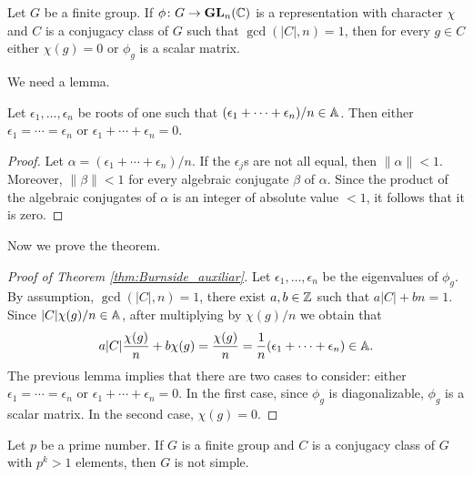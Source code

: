 \begin{theorem}[Burnside]
	\label{thm:Burnside_auxiliar}
	Let $G$ be a finite group. If $\phi\colon G\to\mathbf{GL}_n(\mathbb{C})$ is a representation
	with character $\chi$ and $C$ is a conjugacy class of $G$ such that 
	$\gcd(|C|,n)=1$, then for every $g\in C$ either 
	$\chi(g)=0$ or $\phi_g$ is a scalar matrix. 
\end{theorem}

We need a lemma.

\begin{lemma}
	\label{lem:4Burnside}
	Let $\epsilon_1,\dots,\epsilon_n$ be roots of one such that 
	$(\epsilon_1+\cdots+\epsilon_n)/n\in\mathbb{A}$. Then either 
	$\epsilon_1=\cdots=\epsilon_n$ or 
	$\epsilon_1+\cdots+\epsilon_n=0$.
\end{lemma}

\begin{proof}
	Let $\alpha=(\epsilon_1+\cdots+\epsilon_n)/n$.
	If the $\epsilon_j$s are not all equal, then $\|\alpha\|<1$. Moreover, 
	$\|\beta\|<1$ for every algebraic conjugate $\beta$ of $\alpha$. Since the product 
	of the algebraic conjugates of $\alpha$ is an integer of absolute value 
	$<1$, it follows that it is zero. 
\end{proof}

Now we prove the theorem.

\begin{proof}[Proof of Theorem \ref{thm:Burnside_auxiliar}]
	Let $\epsilon_1,\dots,\epsilon_n$ be the eigenvalues of $\phi_g$. By assumption, 
	$\gcd(|C|,n)=1$, there exist $a,b\in\mathbb{Z}$ such that $a|C|+bn=1$. Since 
	$|C|\chi(g)/n\in\mathbb{A}$, after multiplying by $\chi(g)/n$ we obtain that  
	\[
		a|C|\frac{\chi(g)}{n}+b\chi(g)=\frac{\chi(g)}{n}=\frac{1}{n}(\epsilon_1+\cdots+\epsilon_n)\in\mathbb{A}.
	\]
	The previous lemma implies that there are two cases to consider: 
	either $\epsilon_1=\cdots=\epsilon_n$ or $\epsilon_1+\cdots+\epsilon_n=0$. In the first
	case, since $\phi_g$ is diagonalizable, $\phi_g$ is a scalar matrix. 
	In the second case, $\chi(g)=0$.
\end{proof}

\begin{theorem}[Burnside]
	Let $p$ be a prime number. If $G$ is a finite group and 
	$C$ is a conjugacy class of $G$ with $p^k>1$ elements, then $G$ 
	is not simple.
\end{theorem}

